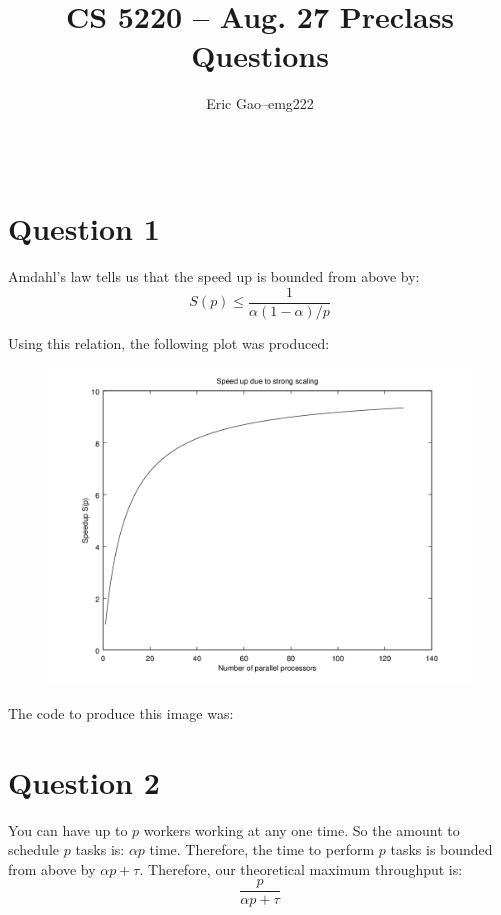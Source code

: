 \documentclass[11pt]{article}
\title{CS 5220 -- Aug. 27 Preclass Questions} %
\author{
  \begin{tabular}{l c l}
    Eric Gao & -- & emg222\\
  \end{tabular}\\
  \rule{\linewidth}{0.4pt}
}
\date{}
\begin{document}
    \thispagestyle{empty}
    \maketitle

    \section*{Question 1}
        Amdahl's law tells us that the speed up is bounded from above by:
        \begin{equation*}
            S(p) \leq \frac{1}{\alpha (1 - \alpha) / p}
        \end{equation*}

        Using this relation, the following plot was produced:
        \begin{figure}[H]
            \centering
            \includegraphics[width=5in]{q1.png}
        \end{figure}

        The code to produce this image was:
        

    \section*{Question 2}
        You can have up to $p$ workers working at any one time. So the amount to schedule $p$ tasks is: $\alpha p$ time. Therefore, the time to perform $p$ tasks is bounded from above by $\alpha p + \tau$. Therefore, our theoretical maximum throughput is:
        \begin{equation*}
            \frac{p}{\alpha p + \tau}
        \end{equation*}
\end{document}

